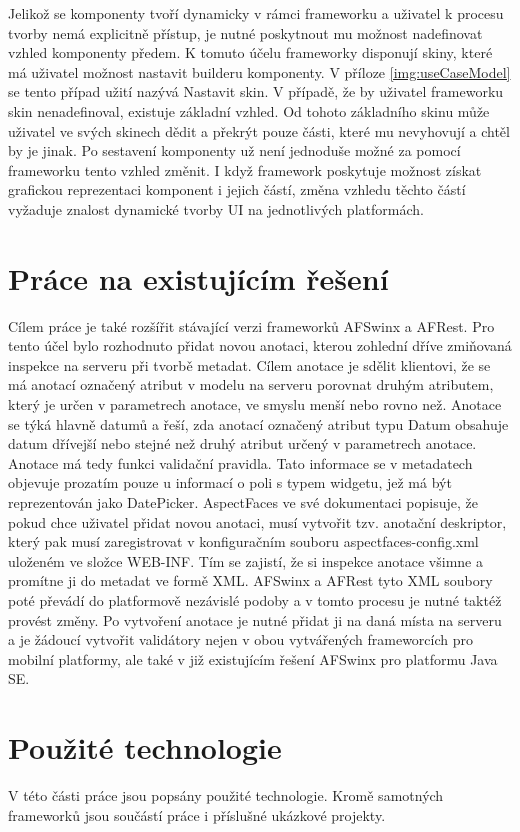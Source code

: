 Jelikož se komponenty tvoří dynamicky v rámci frameworku a uživatel k procesu tvorby nemá explicitně přístup, je nutné poskytnout mu možnost nadefinovat vzhled komponenty předem. K tomuto účelu frameworky disponují skiny, které má uživatel možnost nastavit builderu komponenty. V příloze \ref{img:useCaseModel} se tento případ užití nazývá Nastavit skin. V případě, že by uživatel frameworku skin nenadefinoval, existuje základní vzhled. Od tohoto základního skinu může uživatel ve svých skinech dědit a překrýt pouze části, které mu nevyhovují a chtěl by je jinak. Po sestavení komponenty už není jednoduše možné za pomocí frameworku tento vzhled změnit. I když framework poskytuje možnost získat grafickou reprezentaci komponent i jejich částí, změna vzhledu těchto částí vyžaduje znalost dynamické tvorby UI na jednotlivých platformách.

\section{Práce na existujícím řešení}
Cílem práce je také rozšířit stávající verzi frameworků AFSwinx a AFRest. Pro tento účel bylo rozhodnuto přidat novou anotaci, kterou zohlední dříve zmiňovaná inspekce na serveru při tvorbě metadat. Cílem anotace je sdělit klientovi, že se má anotací označený atribut v modelu na serveru porovnat druhým atributem, který je určen v parametrech anotace, ve smyslu menší nebo rovno než. Anotace se týká hlavně datumů a řeší, zda anotací označený atribut typu Datum obsahuje datum dřívejší nebo stejné než druhý atribut určený v parametrech anotace. Anotace má tedy funkci validační pravidla. Tato informace se v metadatech objevuje prozatím pouze u informací o poli s typem widgetu, jež má být reprezentován jako DatePicker. AspectFaces \cite{aspect-faces} ve své dokumentaci popisuje, že pokud chce uživatel přidat novou anotaci, musí vytvořit tzv. anotační deskriptor, který pak musí zaregistrovat v konfiguračním souboru aspectfaces-config.xml uloženém ve složce WEB-INF. Tím se zajistí, že si inspekce anotace všimne a promítne ji do metadat ve formě XML. AFSwinx a AFRest tyto XML soubory poté převádí do platformově nezávislé podoby \cite{tomasek-thesis} a v tomto procesu je nutné taktéž provést změny. Po vytvoření anotace je nutné přidat ji na daná místa na serveru a je žádoucí vytvořit validátory nejen v obou vytvářených frameworcích pro mobilní platformy, ale také v již existujícím řešení AFSwinx pro platformu Java SE.

\section{Použité technologie}
V této části práce jsou popsány použité technologie. Kromě samotných frameworků jsou součástí práce i příslušné ukázkové projekty.

